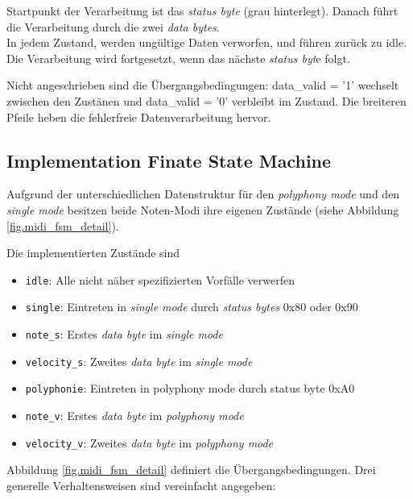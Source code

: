 Startpunkt der Verarbeitung ist das \textit{status byte} (grau hinterlegt). Danach führt die Verarbeitung durch die zwei \textit{data bytes}.\\
In jedem Zustand, werden ungültige Daten verworfen, und führen zurück zu idle. Die Verarbeitung wird fortgesetzt, wenn das nächste \textit{status byt}e folgt.

Nicht angeschrieben sind die Übergangsbedingungen: data\_valid = '1' wechselt zwischen den Zustänen und data\_valid = '0' verbleibt im Zustand. Die breiteren Pfeile heben die fehlerfreie Datenverarbeitung hervor.

\subsection{Implementation Finate State Machine}

Aufgrund der unterschiedlichen Datenstruktur für den \textit{polyphony mode} und den \textit{single mode} besitzen beide Noten-Modi ihre eigenen Zustände (siehe Abbildung \ref{fig.midi_fsm_detail}).

Die implementierten Zustände sind

\begin{itemize}
	\item \lstinline|idle|: Alle nicht näher spezifizierten Vorfälle verwerfen
	\item \lstinline|single|: Eintreten in  \textit{single mode} durch \textit{status bytes} 0x80 oder 0x90
	\item \lstinline|note_s|: Erstes \textit{data byte} im  \textit{single mode}
	\item \lstinline|velocity_s|: Zweites \textit{data byte} im \textit{single mode}
	\item \lstinline|polyphonie|: Eintreten in polyphony mode durch status byte 0xA0
	\item \lstinline|note_v|: Erstes \textit{data byte} im  \textit{polyphony mode}
	\item \lstinline|velocity_v|: Zweites \textit{data byte} im  \textit{polyphony mode}
\end{itemize}

\bigskip

Abbildung \ref{fig.midi_fsm_detail} definiert die Übergangsbedingungen. Drei generelle Verhaltensweisen sind vereinfacht angegeben:

